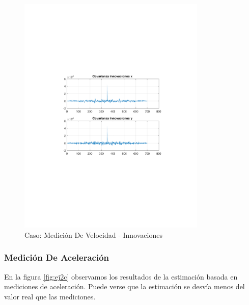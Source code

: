 		\begin{figure}[H]
			\centering
			\includegraphics[width=0.8\textwidth,keepaspectratio]{Figuras/covinn_ej2b.pdf}
			\caption{Caso: Medición De Velocidad - Innovaciones}
			\label{fig:ej2b_innov}
		\end{figure}
			
		\subsubsection{Medición De Aceleración}
		
		En la figura \ref{fig:ej2c} observamos los resultados de la estimación basada en mediciones de aceleración. Puede verse que la estimación se desvía menos del valor real que las mediciones.
		
